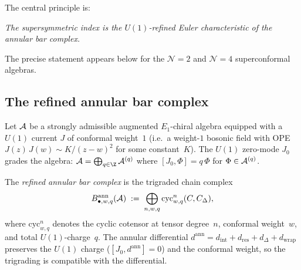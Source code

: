 The central principle is:

\begin{center}
\emph{The supersymmetric index is the $U(1)$-refined
Euler characteristic of the annular bar complex.}
\end{center}

\noindent
The precise statement appears below for the $\mathcal{N}=2$ and
$\mathcal{N}=4$ superconformal algebras.

\subsection{The refined annular bar complex}
\label{subsec:refined-annular}

\begin{definition}%
\label{def:refined-annular-bar}%
%
%
Let $\mathcal{A}$ be a strongly admissible augmented $E_1$-chiral
algebra equipped with a $U(1)$ current $J$ of conformal
weight~$1$ (i.e.\ a weight-$1$ bosonic field with OPE
$J(z)\,J(w)\sim K/(z{-}w)^2$ for some constant~$K$).
The $U(1)$ zero-mode $J_0$ grades the algebra:
$\cA = \bigoplus_{q\in\Z}\cA^{(q)}$ where
$[J_0,\Phi] = q\,\Phi$ for $\Phi\in\mathcal{A}^{(q)}$.

The \emph{refined annular bar complex} is the trigraded
chain complex
\[
B^{\mathrm{ann}}_{\bullet,w,q}(\mathcal{A})
\;:=\;
\bigoplus_{n,w,q}
\mathrm{cyc}^n_{w,q}(C,C_\Delta),
\]
where $\mathrm{cyc}^n_{w,q}$ denotes the cyclic cotensor
at tensor degree~$n$, conformal weight~$w$, and total
$U(1)$-charge~$q$. The annular differential
$d^{\mathrm{ann}} = d_{\mathrm{int}} + d_{\mathrm{res}}
+ d_\Delta + d_{\mathrm{wrap}}$
preserves the $U(1)$ charge ($[J_0, d^{\mathrm{ann}}]=0$)
and the conformal weight, so the trigrading is compatible
with the differential.
\end{definition}

